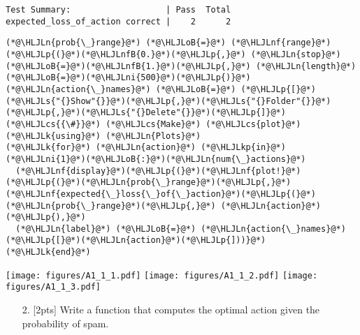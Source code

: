 \documentclass[12pt,a4paper]{article}
\newcommand{\HLJLk}[1]{\textcolor[RGB]{148,91,176}{\textbf{#1}}}
\newcommand{\HLJLkp}[1]{\textcolor[RGB]{148,91,176}{\textbf{#1}}}
\newcommand{\HLJLn}[1]{#1}
\newcommand{\HLJLnf}[1]{\textcolor[RGB]{66,102,213}{#1}}
\newcommand{\HLJLs}[1]{\textcolor[RGB]{201,61,57}{#1}}
\newcommand{\HLJLnfB}[1]{\textcolor[RGB]{59,151,46}{#1}}
\newcommand{\HLJLni}[1]{\textcolor[RGB]{59,151,46}{#1}}
\newcommand{\HLJLoB}[1]{\textcolor[RGB]{102,102,102}{\textbf{#1}}}
\newcommand{\HLJLp}[1]{#1}
\newcommand{\HLJLcs}[1]{\textcolor[RGB]{153,153,119}{\textit{#1}}}
\begin{document}
\begin{lstlisting}
Test Summary:                   | Pass  Total
expected_loss_of_action correct |    2      2
\end{lstlisting}


\begin{lstlisting}
(*@\HLJLn{prob{\_}range}@*) (*@\HLJLoB{=}@*) (*@\HLJLnf{range}@*)(*@\HLJLp{(}@*)(*@\HLJLnfB{0.}@*)(*@\HLJLp{,}@*) (*@\HLJLn{stop}@*)(*@\HLJLoB{=}@*)(*@\HLJLnfB{1.}@*)(*@\HLJLp{,}@*) (*@\HLJLn{length}@*)(*@\HLJLoB{=}@*)(*@\HLJLni{500}@*)(*@\HLJLp{)}@*)
(*@\HLJLn{action{\_}names}@*) (*@\HLJLoB{=}@*) (*@\HLJLp{[}@*)(*@\HLJLs{"{}Show"{}}@*)(*@\HLJLp{,}@*)(*@\HLJLs{"{}Folder"{}}@*)(*@\HLJLp{,}@*)(*@\HLJLs{"{}Delete"{}}@*)(*@\HLJLp{]}@*)
(*@\HLJLcs{{\#}}@*) (*@\HLJLcs{Make}@*) (*@\HLJLcs{plot}@*)
(*@\HLJLk{using}@*) (*@\HLJLn{Plots}@*)
(*@\HLJLk{for}@*) (*@\HLJLn{action}@*) (*@\HLJLkp{in}@*) (*@\HLJLni{1}@*)(*@\HLJLoB{:}@*)(*@\HLJLn{num{\_}actions}@*)
  (*@\HLJLnf{display}@*)(*@\HLJLp{(}@*)(*@\HLJLnf{plot!}@*)(*@\HLJLp{(}@*)(*@\HLJLn{prob{\_}range}@*)(*@\HLJLp{,}@*) (*@\HLJLnf{expected{\_}loss{\_}of{\_}action}@*)(*@\HLJLp{(}@*)(*@\HLJLn{prob{\_}range}@*)(*@\HLJLp{,}@*) (*@\HLJLn{action}@*)(*@\HLJLp{),}@*)
  (*@\HLJLn{label}@*) (*@\HLJLoB{=}@*) (*@\HLJLn{action{\_}names}@*)(*@\HLJLp{[}@*)(*@\HLJLn{action}@*)(*@\HLJLp{]))}@*)
(*@\HLJLk{end}@*)
\end{lstlisting}

\texttt{[image: figures/A1\_1\_1.pdf]}
\texttt{[image: figures/A1\_1\_2.pdf]}
\texttt{[image: figures/A1\_1\_3.pdf]}

\begin{itemize}
\item[2. ] [2pts] Write a function that computes the optimal action given the probability of spam.

\end{itemize}
\end{document}
